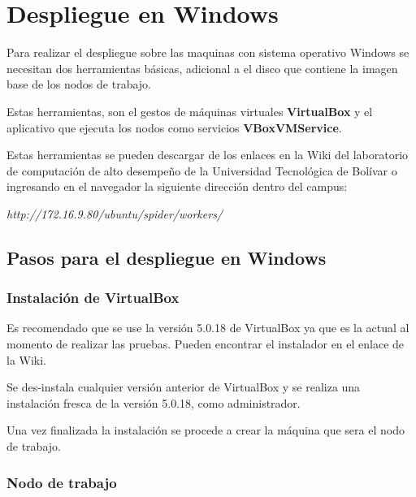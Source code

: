 
\chapter{Despliegue en Windows} %

\label{Chapter6} %

Para realizar el despliegue sobre las maquinas con sistema operativo Windows se necesitan dos herramientas básicas, adicional a el disco que contiene la imagen base de los nodos de trabajo.

Estas herramientas, son el gestos de máquinas virtuales \textbf{VirtualBox} y el aplicativo que ejecuta los nodos como servicios \textbf{VBoxVMService}.

Estas herramientas se pueden descargar de los enlaces en la Wiki del laboratorio de computación de alto desempeño de la Universidad Tecnológica de Bolívar o ingresando en el navegador la siguiente dirección dentro del campus:

\textit{http://172.16.9.80/ubuntu/spider/workers/}


\section{Pasos para el despliegue en Windows}

\subsection{Instalación de VirtualBox}
Es recomendado que se use la versión 5.0.18 de VirtualBox ya que es la actual al momento de realizar las pruebas. Pueden encontrar el instalador en el enlace de la Wiki.

Se des-instala cualquier versión anterior de VirtualBox y se realiza una instalación fresca de la versión 5.0.18, como administrador.

Una vez finalizada la instalación se procede a crear la máquina que sera el nodo de trabajo.

\subsection{Nodo de trabajo}

